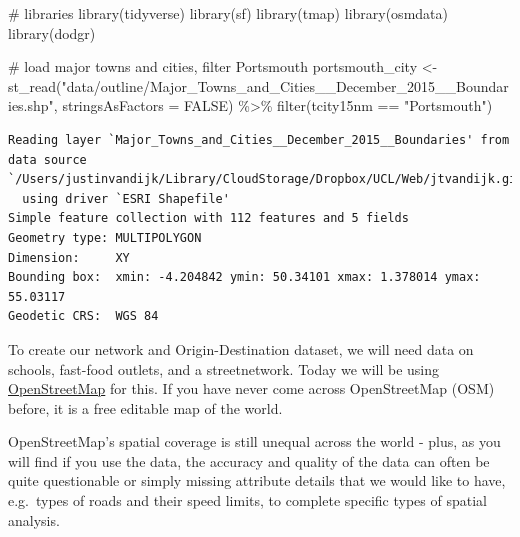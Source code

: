 \documentclass[
  letterpaper,
  DIV=11,
  numbers=noendperiod]{scrreprt}
\newenvironment{Shaded}{\begin{snugshade}}{\end{snugshade}}
\newcommand{\AttributeTok}[1]{\textcolor[rgb]{0.40,0.45,0.13}{#1}}
\newcommand{\CommentTok}[1]{\textcolor[rgb]{0.37,0.37,0.37}{#1}}
\newcommand{\ConstantTok}[1]{\textcolor[rgb]{0.56,0.35,0.01}{#1}}
\newcommand{\FunctionTok}[1]{\textcolor[rgb]{0.28,0.35,0.67}{#1}}
\newcommand{\NormalTok}[1]{\textcolor[rgb]{0.00,0.23,0.31}{#1}}
\newcommand{\OtherTok}[1]{\textcolor[rgb]{0.00,0.23,0.31}{#1}}
\newcommand{\SpecialCharTok}[1]{\textcolor[rgb]{0.37,0.37,0.37}{#1}}
\newcommand{\StringTok}[1]{\textcolor[rgb]{0.13,0.47,0.30}{#1}}
\begin{document}
\begin{codelisting}

\caption{\texttt{R code}}

\begin{Shaded}
\begin{Highlighting}[]
\CommentTok{\# libraries}
\FunctionTok{library}\NormalTok{(tidyverse)}
\FunctionTok{library}\NormalTok{(sf)}
\FunctionTok{library}\NormalTok{(tmap)}
\FunctionTok{library}\NormalTok{(osmdata)}
\FunctionTok{library}\NormalTok{(dodgr)}

\CommentTok{\# load major towns and cities, filter Portsmouth}
\NormalTok{portsmouth\_city }\OtherTok{\textless{}{-}} \FunctionTok{st\_read}\NormalTok{(}\StringTok{"data/outline/Major\_Towns\_and\_Cities\_\_December\_2015\_\_Boundaries.shp"}\NormalTok{,}
    \AttributeTok{stringsAsFactors =} \ConstantTok{FALSE}\NormalTok{) }\SpecialCharTok{\%\textgreater{}\%}
    \FunctionTok{filter}\NormalTok{(tcity15nm }\SpecialCharTok{==} \StringTok{"Portsmouth"}\NormalTok{)}
\end{Highlighting}
\end{Shaded}

\end{codelisting}

\begin{verbatim}
Reading layer `Major_Towns_and_Cities__December_2015__Boundaries' from data source `/Users/justinvandijk/Library/CloudStorage/Dropbox/UCL/Web/jtvandijk.github.io/GEOG0114Q/data/outline/Major_Towns_and_Cities__December_2015__Boundaries.shp' 
  using driver `ESRI Shapefile'
Simple feature collection with 112 features and 5 fields
Geometry type: MULTIPOLYGON
Dimension:     XY
Bounding box:  xmin: -4.204842 ymin: 50.34101 xmax: 1.378014 ymax: 55.03117
Geodetic CRS:  WGS 84
\end{verbatim}

To create our network and Origin-Destination dataset, we will need data
on schools, fast-food outlets, and a streetnetwork. Today we will be
using \href{https://www.openstreetmap.org}{OpenStreetMap} for this. If
you have never come across OpenStreetMap (OSM) before, it is a free
editable map of the world.

\begin{tcolorbox}[enhanced jigsaw, rightrule=.15mm, colback=white, opacityback=0, opacitybacktitle=0.6, coltitle=black, colbacktitle=quarto-callout-note-color!10!white, breakable, arc=.35mm, title=\textcolor{quarto-callout-note-color}{\faInfo}\hspace{0.5em}{Note}, left=2mm, leftrule=.75mm, bottomtitle=1mm, toprule=.15mm, bottomrule=.15mm, colframe=quarto-callout-note-color-frame, toptitle=1mm, titlerule=0mm]

OpenStreetMap's spatial coverage is still unequal across the world -
plus, as you will find if you use the data, the accuracy and quality of
the data can often be quite questionable or simply missing attribute
details that we would like to have, e.g.~types of roads and their speed
limits, to complete specific types of spatial analysis.

\end{tcolorbox}
\end{document}

